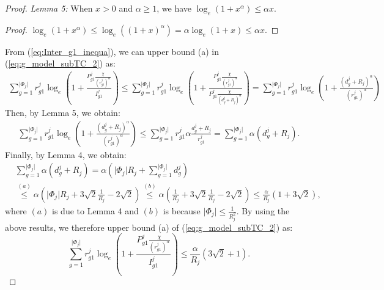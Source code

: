 \documentclass[journal,draftclsnofoot,onecolumn,12pt,twoside]{IEEEtran}
\begin{document}
\begin{proof}
{\em Lemma 5:} When $x>0$ and $\alpha\geq 1$, we have $\log_e(1+x^{\alpha})\leq \alpha x$.

\begin{proof}
$\log_e(1+x^{\alpha})\leq \log_e\left((1+x)^{\alpha}\right)=\alpha\log_e(1+x)\leq \alpha x$.
\end{proof}

From (\ref{eq:Inter_g1_inequa}), we can upper bound (a) in (\ref{eq:g_model_subTC_2}) as:
\begin{equation}
\begin{aligned}
\sum_{g=1}^{\vert\Phi_j\vert} r_{g1}^j\log_e\left(1+\frac{P_{g1}^j\frac{\chi}{(r_{g1}^j)^{\alpha}}}{I_{g1}^j}\right)\leq \sum_{g=1}^{\vert\Phi_j\vert} r_{g1}^j\log_e\left(1+\frac{P_{g1}^j\frac{\chi}{(r_{g1}^j)^{\alpha}}}{P_{g1}^j\frac{\chi}{(d_g^j+R_j)^{\alpha}}}\right)=\sum_{g=1}^{\vert\Phi_j\vert} r_{g1}^j\log_e\left(1+\frac{(d_g^j+R_j)^{\alpha}}{(r_{g1}^j)^{\alpha}}\right)
\end{aligned}
\end{equation}
Then, by Lemma 5, we obtain:
\begin{equation}
\begin{aligned}
\sum_{g=1}^{\vert\Phi_j\vert} r_{g1}^j\log_e\left(1+\frac{(d_g^j+R_j)^{\alpha}}{(r_{g1}^j)^{\alpha}}\right)\leq \sum_{g=1}^{\vert\Phi_j\vert} r_{g1}^j \alpha\frac{d_g^j+R_j}{r_{g1}^j}=\sum_{g=1}^{\vert\Phi_j\vert} \alpha (d_g^j+R_j).
\end{aligned}
\end{equation}
Finally, by Lemma 4, we obtain:
\begin{equation}
\begin{aligned}
&\sum_{g=1}^{\vert\Phi_j\vert} \alpha (d_g^j+R_j)=\alpha\left(\vert\Phi_j\vert R_j+\sum_{g=1}^{\vert\Phi_j\vert}d_g^j\right)\\
&\stackrel{(a)}{\leq} \alpha\left(\vert\Phi_j\vert R_j+3\sqrt{2}\frac{1}{R_j}-2\sqrt{2}\right)\stackrel{(b)}{\leq}\alpha\left(\frac{1}{R_j}+3\sqrt{2}\frac{1}{R_j}-2\sqrt{2}\right)\leq \frac{\alpha}{R_j}\left(1+3\sqrt{2}\right),
\end{aligned}
\end{equation}
where $(a)$ is due to Lemma 4 and $(b)$ is because $\vert\Phi_j\vert\leq \frac{1}{R_j^2}$. By using the above results, we therefore upper bound (a) of (\ref{eq:g_model_subTC_2}) as:
\begin{equation}\label{eq:g_model_subTC_termA}
\sum_{g=1}^{\vert\Phi_j\vert} r_{g1}^j\log_e\left(1+\frac{P_{g1}^j\frac{\chi}{(r_{g1}^j)^{\alpha}}}{I_{g1}^j}\right)\leq \frac{\alpha}{R_j}\left(3\sqrt{2}+1\right).
\end{equation}


\end{proof}
\end{document}
